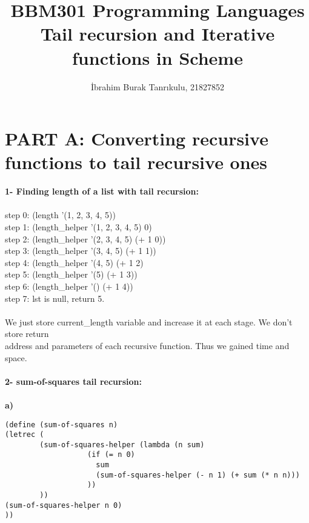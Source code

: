 \documentclass[11pt]{article}
\begin{document}
\author{İbrahim Burak Tanrıkulu, 21827852}
\title{BBM301 Programming Languages\\Tail recursion and Iterative functions in Scheme}
\maketitle

\section*{PART A: Converting recursive functions to tail recursive ones}

{\bf 1- Finding length of a list with tail recursion:}\\~\\
step 0:\hspace{0,5 cm} (length '(1, 2, 3, 4, 5))\\
step 1:\hspace{0,5 cm} (length\_helper '(1, 2, 3, 4, 5) 0)\\
step 2:\hspace{0,5 cm} (length\_helper '(2, 3, 4, 5) (+ 1 0))\\
step 3:\hspace{0,5 cm} (length\_helper '(3, 4, 5) (+ 1 1))\\
step 4:\hspace{0,5 cm} (length\_helper '(4, 5) (+ 1 2)\\
step 5:\hspace{0,5 cm} (length\_helper '(5) (+ 1 3))\\
step 6:\hspace{0,5 cm} (length\_helper '() (+ 1 4))\\
step 7:\hspace{0,5 cm} lst is null, return 5.\\~\\
We just store current\_length variable and increase it at each stage. We don't store return\\
address and parameters of each recursive function. Thus we gained time and space.
\\~\\
{\bf 2- sum-of-squares tail recursion:}\\~\\
{\bf a)}
\begin{lstlisting}
(define (sum-of-squares n)
(letrec (
        (sum-of-squares-helper (lambda (n sum)
                   (if (= n 0)
                     sum
                     (sum-of-squares-helper (- n 1) (+ sum (* n n)))
                   ))
        ))
(sum-of-squares-helper n 0)
))
\end{lstlisting}
\end{document}
